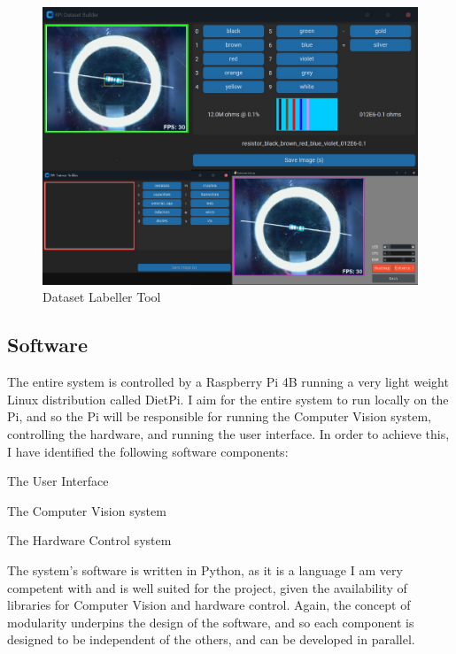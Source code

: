 \begin{figure}
  \begin{minipage}[t]{0.49\textwidth}
      \centering
      \includegraphics[width=\textwidth]{imgs/software/tools.png}
      \caption{Dataset Labeller Tool}
      \label{fig:customtool}
  \end{minipage}
  \hfill
\end{figure}

\subsection{Software}
The entire system is controlled by a Raspberry Pi 4B running a very light weight Linux distribution called DietPi.
I aim for the entire system to run locally on the Pi, and so the Pi will be responsible for running the Computer Vision system,
controlling the hardware, and running the user interface. In order to achieve this, I have identified the following software components:
\begin{mylist}
  \item The User Interface
  \item The Computer Vision system
  \item The Hardware Control system
\end{mylist}
The system's software is written in Python\cite{python}, as it is a language I am very competent with and is well suited for the project, given the 
availability of libraries for Computer Vision and hardware control. Again, the concept of modularity underpins the design of the software,
and so each component is designed to be independent of the others, and can be developed in parallel.

